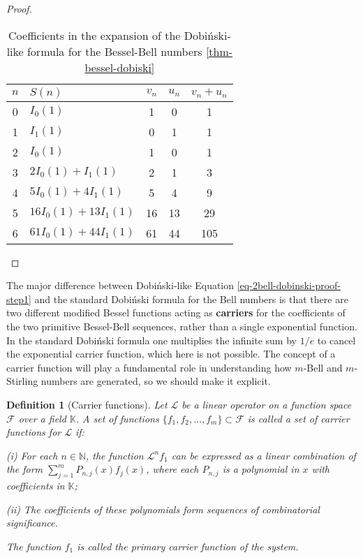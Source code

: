 \documentclass[a4paper]{amsart}
\newtheorem{definition}[theorem]{Definition}
\begin{document}
\begin{proof}
\begin{table}[]
    \centering
        \begin{tabular}{|c|l|c|c|c|}
        \hline
        $n$ & $S(n)$                & $v_n$ & $u_n$ & $v_n+u_n$ \\
        \hline
        0   & $I_0(1)$              & 1     & 0     & 1         \\
        1   & $I_1(1)$              & 0     & 1     & 1         \\
        2   & $I_0(1)$              & 1     & 0     & 1         \\
        3   & $2I_0(1)+I_1(1)$    & 2     & 1     & 3         \\
        4   & $5I_0(1)+4I_1(1)$   & 5     & 4     & 9         \\
        5   & $16I_0(1)+13I_1(1)$ & 16    & 13    & 29        \\
        6   & $61I_0(1)+44I_1(1)$ & 61    & 44 &    105 \\ 
        \hline
        \end{tabular}
        \bigskip
    \caption{Coefficients in the expansion of the Dobiński-like formula for the Bessel-Bell numbers \ref{thm-bessel-dobiski}}
    \label{tab-vn-un-coefs}
\end{table}
\end{proof}

The major difference between Dobiński-like Equation \eqref{eq-2bell-dobinski-proof-step1} and the standard Dobiński formula for the Bell numbers is that there are two different modified Bessel functions acting as \textbf{carriers} for the coefficients of the two primitive Bessel-Bell sequences, rather than a single exponential function. In the standard Dobiński formula one multiplies the infinite sum by $1/e$ to cancel the exponential carrier function, which here is not possible. The concept of a carrier function will play a fundamental role in understanding how $m$-Bell and $m$-Stirling numbers are generated, so we should make it explicit.

\begin{definition}[Carrier functions]
Let $\mathcal{L}$ be a linear operator on a function space $\mathcal{F}$ over a field $\mathbb{K}$. A set of functions $\{f_1, f_2, \ldots, f_m\} \subset \mathcal{F}$ is called a set of \textit{carrier functions} for $\mathcal{L}$ if:

(i) For each $n \in \mathbb{N}$, the function $\mathcal{L}^n f_1$ can be expressed as a linear combination of the form $\sum_{j=1}^m P_{n,j}(x) f_j(x)$, where each $P_{n,j}$ is a polynomial in $x$ with coefficients in $\mathbb{K}$;

(ii) The coefficients of these polynomials form sequences of combinatorial significance.

The function $f_1$ is called the \textit{primary carrier function} of the system.
\end{definition}
\end{document}
